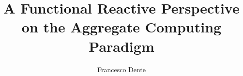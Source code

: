 \title[FRP in Aggregate Computing]{A Functional Reactive Perspective on the Aggregate Computing Paradigm}
\author{Francesco Dente}
\date{}